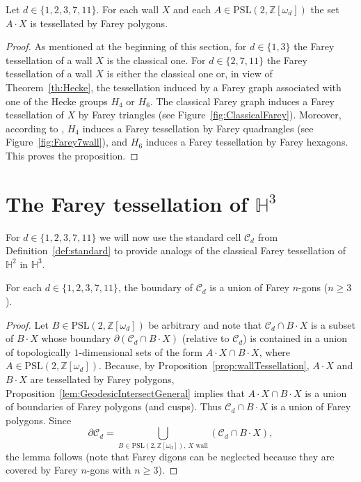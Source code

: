 \documentclass[graybox]{svmult}
\begin{document}
\begin{proposition}%
\label{prop:wallTessellation}
Let $d\in\{1,2,3,7,11\}$. For each wall $X$ and each $A\in \mathrm{PSL}(2,\mathbb{Z}[\omega_d])$ the set $A\cdot X$ is tessellated by Farey polygons. 
\end{proposition}

\begin{proof}
As mentioned at the beginning of this section, for $d\in\{1,3\}$ the Farey tessellation of a wall $X$ is the classical one. For $d\in\{2,7,11\}$ the Farey tessellation of a wall $X$ is either the classical one or, in view of Theorem~\ref{th:Hecke}, the tessellation induced by a Farey graph associated with one of the Hecke groups $H_4$ or $H_6$. The classical Farey graph induces a Farey  tessellation of $X$ by Farey triangles (see Figure~\ref{fig:ClassicalFarey}). Moreover, according to \cite{S-W}, $H_4$ induces a Farey tessellation by Farey quadrangles (see Figure~\ref{fig:Farey7wall}), and $H_6$ induces a Farey tessellation by Farey hexagons. This proves the proposition. 
\end{proof}

\section{The Farey tessellation of $\mathbb H^{3}$}\label{sec:polyhedron}

For $d\in\{1,2,3,7,11\}$ we will now use the standard cell $\mathcal{C}_d$ from Definition~\ref{def:standard} to provide analogs of the classical Farey tessellation of~$\mathbb{H}^2$ in $\mathbb{H}^3$.

\begin{lemma}\label{lem:boundFarey}
For each $d\in\{1,2,3,7,11\}$, the boundary of $\mathcal{C}_d$ is a union of Farey $n$-gons ($n\ge 3$).
\end{lemma}

\begin{proof}
Let $B\in \mathrm{PSL}(2,\mathbb{Z}[\omega_d])$ be arbitrary and note that $\mathcal{C}_d \cap B\cdot X$ is a subset of  $B\cdot X$ whose boundary $\partial(\mathcal{C}_d \cap B\cdot X)$ (relative to $\mathcal{C}_d$) is contained in a union of topologically $1$-dimensional sets of the form  $A\cdot X \cap B\cdot X$, where $A\in \mathrm{PSL}(2,\mathbb{Z}[\omega_d])$. Because, by Proposition~\ref{prop:wallTessellation},
$A\cdot X$ and $B\cdot X$ are tessellated by Farey polygons, Proposition~\ref {lem:GeodesicIntersectGeneral} implies that $A\cdot X \cap B\cdot X$ is a union of boundaries of Farey polygons (and cusps). Thus $\mathcal{C}_d \cap B\cdot X$ is a union of Farey polygons. Since 
\[
\partial \mathcal{C}_d = \bigcup_{B\in \mathrm{PSL}(2,\mathbb{Z}[\omega_d]),\, X \text{ wall}} (\mathcal{C}_d \cap B\cdot X), 
\]
the lemma follows (note that Farey digons can be neglected because they are covered by Farey $n$-gons with $n\ge 3$).
\end{proof}
\end{document}
